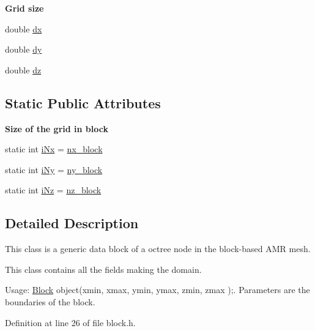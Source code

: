 \begin{Indent}{\bf Grid size}\par
\begin{DoxyCompactItemize}
\item 
double \hyperlink{classmy_octree_1_1_block_a43d174dd0a3f418dc140e5ac72e05075}{dx}
\item 
double \hyperlink{classmy_octree_1_1_block_ac509a953dfc153ace7844e89b07021ab}{dy}
\item 
double \hyperlink{classmy_octree_1_1_block_a5fd6660ee5d77a96782a41824a5f07f7}{dz}
\end{DoxyCompactItemize}
\end{Indent}
\subsection*{Static Public Attributes}
\begin{Indent}{\bf Size of the grid in block}\par
\begin{DoxyCompactItemize}
\item 
static int \hyperlink{classmy_octree_1_1_block_a03e3db10912ce5033badcbf501554ba2}{i\+Nx} = \hyperlink{namespacemy_octree_a7f30e98430213a41919e16e40abc2078}{nx\+\_\+block}
\item 
static int \hyperlink{classmy_octree_1_1_block_ae0b1a7bbe71892b0b4e89cfafd4b318d}{i\+Ny} = \hyperlink{namespacemy_octree_a39784fe68930da363b3ad335a47bed19}{ny\+\_\+block}
\item 
static int \hyperlink{classmy_octree_1_1_block_a1cf85662b6815a2a4e6f013b15fb884a}{i\+Nz} = \hyperlink{namespacemy_octree_a2b2fa3a7759c3ff5b129847af3e09cc3}{nz\+\_\+block}
\end{DoxyCompactItemize}
\end{Indent}


\subsection{Detailed Description}
This class is a generic data block of a octree node in the block-\/based A\+M\+R mesh. 

This class contains all the fields making the domain.

Usage\+: \hyperlink{classmy_octree_1_1_block}{Block} object(xmin, xmax, ymin, ymax, zmin, zmax );. Parameters are the boundaries of the block. 

Definition at line 26 of file block.\+h.



